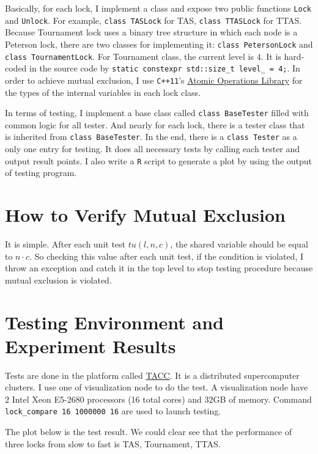 \documentclass[a4paper]{report}
\begin{document}
Basically, for each lock, I implement a class and expose two public functions \lstinline{Lock} and \lstinline{Unlock}.
For example, \lstinline{class TASLock} for TAS, \lstinline{class TTASLock} for TTAS.
Because Tournament lock uses a binary tree structure in which each node is a Peterson lock, there are two classes for implementing it: \lstinline{class PetersonLock} and \lstinline{class TournamentLock}.
For Tournament class, the current level is $4$.
It is hard-coded in the source code by \lstinline{static constexpr std::size_t level_ = 4;}.
In order to achieve mutual exclusion, I use \lstinline{C++11}'s \href{http://en.cppreference.com/w/cpp/atomic}{Atomic Operations Library} for the types of the internal variables in each lock class.

In terms of testing, I implement a base class called \lstinline{class BaseTester} filled with common logic for all tester.
And nearly for each lock, there is a tester class that is inherited from \lstinline{class BaseTester}.
In the end, there is a \lstinline{class Tester} as a only one entry for testing.
It does all necessary tests by calling each tester and output result points.
I also write a \lstinline{R} script to generate a plot by using the output of testing program.

\section*{How to Verify Mutual Exclusion}
It is simple.
After each unit test $tu(l, n, c)$, the shared variable should be equal to $n \cdot c$.
So checking this value after each unit test, if the condition is violated, I throw an exception and catch it in the top level to stop testing procedure because mutual exclusion is violated.

\section*{Testing Environment and Experiment Results}
Tests are done in the platform called \href{https://www.tacc.utexas.edu/}{TACC}.
It is a distributed supercomputer clusters.
I use one of visualization node to do the test.
A visualization node have 2 Intel Xeon E5-2680 processors (16 total cores) and 32GB of memory.
Command \lstinline{lock_compare 16 1000000 16} are used to launch testing.

The plot below is the test result.
We could clear see that the performance of three locks from slow to fast is TAS, Tournament, TTAS.
\end{document}
